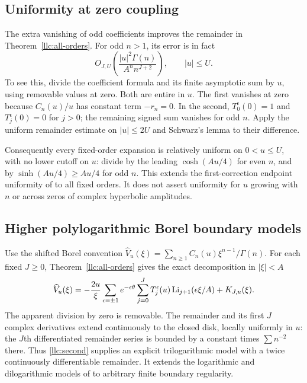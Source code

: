 \subsection{Uniformity at zero coupling}

The extra vanishing of odd coefficients improves the remainder in
Theorem~\ref{llc:all-orders}. For odd $n>1$, its error is in fact
\[
 O_{J,U}\!\left(\frac{|u|^2\Gamma(n)}{A^n n^{J+2}}\right),
 \qquad |u|\le U.
\]
To see this, divide the coefficient formula and its finite asymptotic
sum by $u$, using removable values at zero. Both are entire in $u$.
The first vanishes at zero because $C_n(u)/u$ has constant term $-r_n=0$.
In the second, $T_0^\epsilon(0)=1$ and $T_j^\epsilon(0)=0$ for $j>0$;
the remaining signed sum vanishes for odd $n$. Apply the uniform
remainder estimate on $|u|\le2U$ and Schwarz's lemma to their difference.

Consequently every fixed-order expansion is relatively uniform on
$0<u\le U$, with no lower cutoff on $u$: divide by the leading
$\cosh(Au/4)$ for even $n$, and by $\sinh(Au/4)\ge Au/4$ for odd $n$.
This extends the first-correction endpoint uniformity of
\cite{llc:continuation} to all fixed orders. It does not assert uniformity
for $u$ growing with $n$ or across zeros of complex hyperbolic amplitudes.

\subsection{Higher polylogarithmic Borel boundary models}

Use the shifted Borel convention
$\widehat V_u(\xi)=\sum_{n\ge1}C_n(u)\xi^{n-1}/\Gamma(n)$.
For each fixed $J\ge0$, Theorem~\ref{llc:all-orders} gives the exact
decomposition in $|\xi|<A$
\begin{equation}\label{llc:borel}
 \widehat V_u(\xi)=-\frac{2u}{\xi}
 \sum_{\epsilon=\pm1}e^{-\epsilon\theta}
 \sum_{j=0}^J T_j^\epsilon(u)\operatorname{Li}_{j+1}(\epsilon\xi/A)
 +K_{J,u}(\xi).
\end{equation}
The apparent division by zero is removable. The remainder and its
first $J$ complex derivatives extend continuously to the closed disk,
locally uniformly in $u$: the $J$th differentiated remainder series
is bounded by a constant times $\sum n^{-2}$ there.
Thus \eqref{llc:second} supplies an explicit trilogarithmic model with
a twice continuously differentiable remainder. It extends the logarithmic
and dilogarithmic models of \cite{llc:reversion} to arbitrary finite
boundary regularity.

